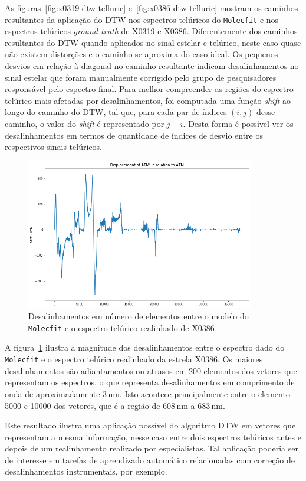 As figuras~\ref{fig:x0319-dtw-telluric} e~\ref{fig:x0386-dtw-telluric} mostram os caminhos resultantes da aplicação do DTW nos espectros telúricos do \texttt{Molecfit} e nos espectros telúricos \textit{ground-truth} de X0319 e X0386. Diferentemente dos caminhos resultantes do DTW quando aplicados no sinal estelar e telúrico, neste caso quase não existem distorções e o caminho se aproxima do caso ideal. Os pequenos desvios em relação à diagonal no caminho resultante indicam desalinhamentos no sinal estelar que foram manualmente corrigido pelo grupo de pesquisadores responsável pelo espectro final. 
Para melhor compreender as regiões do espectro telúrico mais afetadas por desalinhamentos, foi computada uma função \textit{shift} ao longo do caminho do DTW, tal que, para cada par de índices $(i,j)$ desse caminho, o valor do \textit{shift} é representado por $j - i$. Desta forma é possível ver os desalinhamentos em termos de quantidade de índices de desvio entre os respectivos sinais telúricos.

\begin{figure}[htb]
\centering
\includegraphics[width=10cm]{figuras/x0386_displacement.png}
\caption{Desalinhamentos em número de elementos entre o modelo do \texttt{Molecfit} e o espectro telúrico realinhado de X0386}
\label{fig:x0386-displacement}
\end{figure}

A figura~\ref{fig:x0386-displacement} ilustra a magnitude dos desalinhamentos entre o espectro dado do \texttt{Molecfit} e o espectro telúrico realinhado da estrela X0386. Os maiores desalinhamentos são adiantamentos ou atrasos em 200 elementos dos vetores que representam os espectros, o que representa desalinhamentos em comprimento de onda de aproximadamente 3\,nm. Isto acontece principalmente entre o elemento 5000 e 10000 dos vetores, que é a região de 608\,nm a 683\,nm.

Este resultado ilustra uma aplicação possível do algoritmo DTW em vetores que representam a mesma informação, nesse caso entre dois espectros telúricos antes e depois de um realinhamento realizado por especialistas. Tal aplicação poderia ser de interesse em tarefas de aprendizado automático relacionadas com correção de desalinhamentos instrumentais, por exemplo.

